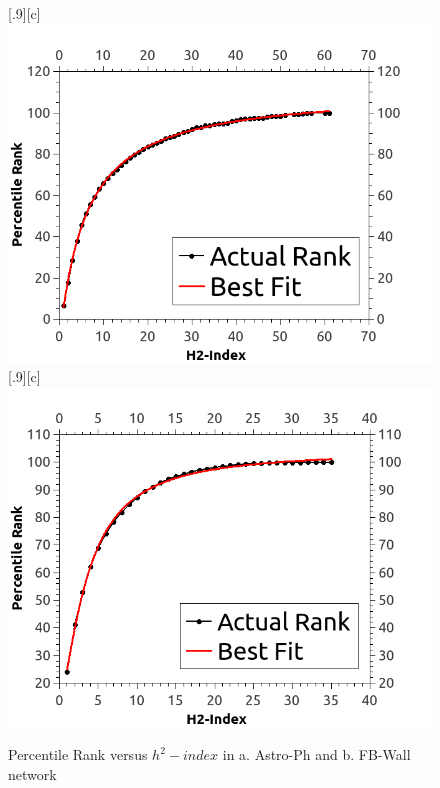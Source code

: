 \documentclass[12pt,3p]{article}
\begin{document}
\begin{figure}[htp]
  \centering
  [.9\linewidth][c]{%
    \includegraphics[width=.9\linewidth]{images/astroph_qti.png}}\quad
  [.9\linewidth][c]{%
    \includegraphics[width=.9\linewidth]{images/fbwall_qti.png}}
  \caption{Percentile Rank versus $h^2-index$ in a. Astro-Ph and b. FB-Wall network}
  \label{fig1}
\end{figure}

\end{document}

